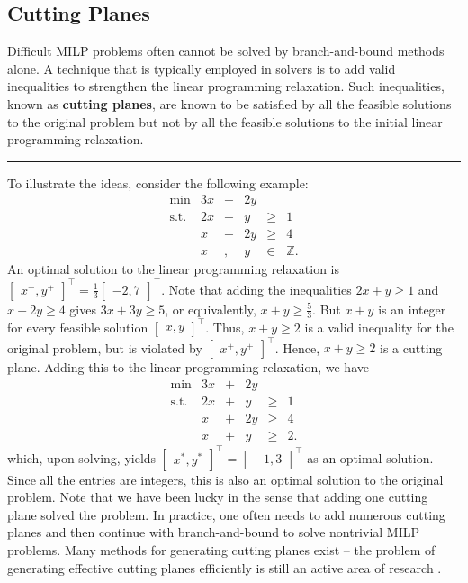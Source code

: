 \subsection{Cutting Planes}

Difficult MILP problems often cannot be solved by branch-and-bound
methods alone. A technique that is typically employed in solvers is to
add valid inequalities to strengthen the linear programming relaxation.
Such inequalities, known as \textbf{cutting planes}, are known to be
satisfied by all the feasible solutions to the original problem but not
by all the feasible solutions to the initial linear programming
relaxation. 
\begin{center}\rule{0.5\linewidth}{.4pt}\end{center}
To illustrate the ideas, consider the following example:
\[\begin{array}{rrcrlll}
\min & 3x & + & 2y \\
\text{s.t.} & 2x & + & y & \geq & 1 \\
 &  x & + & 2y & \geq & 4 \\
 &  x & , & y & \in & \mathbb{Z}.
\end{array}\] An optimal solution to the linear programming relaxation
is
\(\begin{bmatrix} x^+, y^+ \end{bmatrix}^{\!\top} = \frac{1}{3}\begin{bmatrix} -2,7 \end{bmatrix}^{\!\top}\).
Note that adding the inequalities \(2x + y \geq 1\) and
\(x + 2y \geq 4\) gives \(3x + 3y \geq 5\), or equivalently,
\(x + y \geq \frac{5}{3}\). But \(x+y\) is an integer for every feasible
solution \(\begin{bmatrix} x,y \end{bmatrix}^{\!\top}\). Thus,
\(x + y \geq 2\) is a valid inequality for the original problem, but is
violated by \(\begin{bmatrix} x^+, y^+ \end{bmatrix}^{\!\top}\).
Hence, \(x + y \geq 2\) is a cutting plane. Adding this to the linear
programming relaxation, we have \[\begin{array}{rrcrlll}
\min & 3x & + & 2y \\
\text{s.t.} & 2x & + & y & \geq & 1 \\
 &  x & + & 2y & \geq & 4 \\
 &  x & + & y & \geq & 2.
\end{array}\] which, upon solving, yields 
\(\begin{bmatrix} x^*,y^* \end{bmatrix}^{\!\top} = \begin{bmatrix} -1,3 \end{bmatrix}^{\!\top}\)
as an optimal solution. Since all the entries are integers, this is also
an optimal solution to the original problem. \newl
Note that we have been lucky in the sense that adding one cutting plane solved the problem. In
practice, one often needs to add numerous cutting planes and then continue
with branch-and-bound to solve nontrivial MILP problems. Many methods for generating cutting planes exist -- the problem of generating effective cutting planes efficiently is still an active area
of research \cite{OPT_C}.
